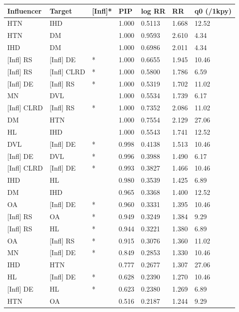 \begin{tabular}{lllllll}
  \hline
Influencer & Target & \mbox{[Infl]}* & PIP & log RR & RR & q0 (/1kpy) \\ 
  \hline
HTN & IHD &  & 1.000 & 0.5113 & 1.668 & 12.52 \\ 
  HTN & DM &  & 1.000 & 0.9593 & 2.610 & 4.34 \\ 
  IHD & DM &  & 1.000 & 0.6986 & 2.011 & 4.34 \\ 
  \mbox{[Infl]} RS & \mbox{[Infl]} DE & * & 1.000 & 0.6655 & 1.945 & 10.46 \\ 
  \mbox{[Infl]} RS & \mbox{[Infl]} CLRD & * & 1.000 & 0.5800 & 1.786 & 6.59 \\ 
  \mbox{[Infl]} DE & \mbox{[Infl]} RS & * & 1.000 & 0.5319 & 1.702 & 11.02 \\ 
  MN & DVL &  & 1.000 & 0.5534 & 1.739 & 6.17 \\ 
  \mbox{[Infl]} CLRD & \mbox{[Infl]} RS & * & 1.000 & 0.7352 & 2.086 & 11.02 \\ 
  DM & HTN &  & 1.000 & 0.7554 & 2.129 & 27.06 \\ 
  HL & IHD &  & 1.000 & 0.5543 & 1.741 & 12.52 \\ 
  DVL & \mbox{[Infl]} DE & * & 0.998 & 0.4138 & 1.513 & 10.46 \\ 
  \mbox{[Infl]} DE & DVL & * & 0.996 & 0.3988 & 1.490 & 6.17 \\ 
  \mbox{[Infl]} CLRD & \mbox{[Infl]} DE & * & 0.993 & 0.3827 & 1.466 & 10.46 \\ 
  IHD & HL &  & 0.980 & 0.3539 & 1.425 & 6.89 \\ 
  DM & IHD &  & 0.965 & 0.3368 & 1.400 & 12.52 \\ 
  OA & \mbox{[Infl]} DE & * & 0.960 & 0.3331 & 1.395 & 10.46 \\ 
  \mbox{[Infl]} RS & OA & * & 0.949 & 0.3249 & 1.384 & 9.29 \\ 
  \mbox{[Infl]} RS & HL & * & 0.944 & 0.3221 & 1.380 & 6.89 \\ 
  OA & \mbox{[Infl]} RS & * & 0.915 & 0.3076 & 1.360 & 11.02 \\ 
  MN & \mbox{[Infl]} DE & * & 0.849 & 0.2853 & 1.330 & 10.46 \\ 
  IHD & HTN &  & 0.777 & 0.2677 & 1.307 & 27.06 \\ 
  HL & \mbox{[Infl]} DE & * & 0.628 & 0.2390 & 1.270 & 10.46 \\ 
  \mbox{[Infl]} DE & HL & * & 0.623 & 0.2380 & 1.269 & 6.89 \\ 
  HTN & OA &  & 0.516 & 0.2187 & 1.244 & 9.29 \\ 
   \hline
\end{tabular}
